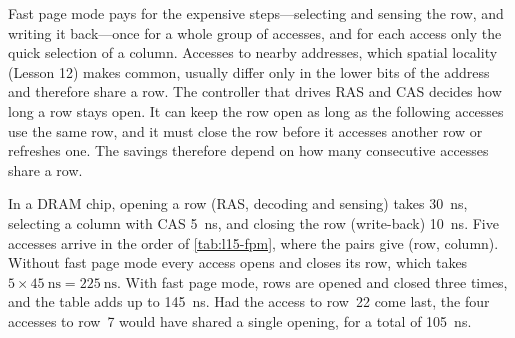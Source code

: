 \documentclass[../main.tex]{subfiles}
\begin{document}
Fast page mode pays for the expensive steps---selecting and sensing the row,
and writing it back---once for a whole group of accesses, and for each access
only the quick selection of a column.  Accesses to nearby addresses, which
spatial locality (Lesson 12) makes common, usually differ only in the lower
bits of the address and therefore share a row.  The controller that drives RAS and CAS decides
how long a row stays open.  It can keep the row open as long as the following
accesses use the same row, and it must close the row before it accesses
another row or refreshes one.  The savings therefore depend on how many
consecutive accesses share a row.

\begin{example}
  \label{ex:l15-fpm}
  In a DRAM chip, opening a row (RAS, decoding and sensing) takes
  \SI{30}{\nano\second}, selecting a column with CAS \SI{5}{\nano\second}, and
  closing the row (write-back) \SI{10}{\nano\second}.  Five accesses arrive in
  the order of \cref{tab:l15-fpm}, where the pairs give (row, column).
  Without fast page mode every access opens and closes its row, which takes
  $5\times\SI{45}{\nano\second} = \SI{225}{\nano\second}$.  With fast page
  mode, rows are opened and closed three times, and the table adds up to
  \SI{145}{\nano\second}.  Had the access to row~22 come last, the four
  accesses to row~7 would have shared a single opening, for a total of
  \SI{105}{\nano\second}.
\end{example}
\end{document}
